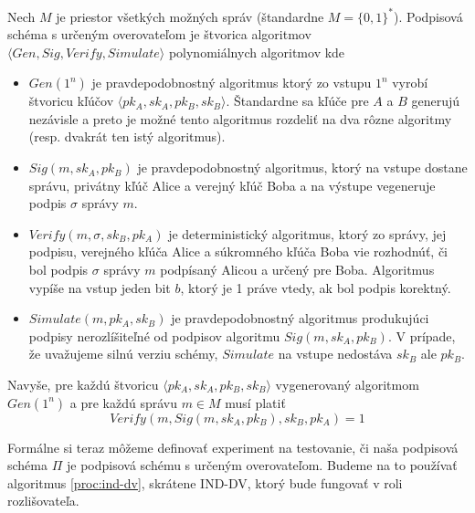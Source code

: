 \begin{definicia}
    Nech $M$ je priestor všetkých možných správ (štandardne
    $M=\{0,1\}^*$). Podpisová schéma s určeným overovateľom je
    štvorica algoritmov
    $\langle Gen, Sig, Verify, Simulate \rangle$ polynomiálnych
    algoritmov kde
    \begin{itemize}
        \item $Gen(1^n)$ je pravdepodobnostný algoritmus ktorý zo
            vstupu $1^n$ vyrobí štvoricu kľúčov
            $\langle pk_A,sk_A,pk_B,sk_B \rangle$.
            Štandardne sa kľúče pre $A$ a $B$ generujú nezávisle a
            preto je možné tento algoritmus rozdeliť na dva rôzne
            algoritmy (resp. dvakrát ten istý algoritmus).

        \item $Sig(m,sk_A,pk_B)$ je pravdepodobnostný algoritmus,
            ktorý na vstupe dostane správu, privátny kľúč Alice a
            verejný kľúč Boba a na výstupe vegeneruje podpis $\sigma$
            správy $m$.

        \item $Verify(m,\sigma,sk_B,pk_A)$ je deterministický
            algoritmus, ktorý zo správy, jej podpisu, verejného kľúča
            Alice a súkromného kľúča Boba vie rozhodnúť, či bol podpis
            $\sigma$ správy $m$ podpísaný Alicou a určený pre Boba.
            Algoritmus vypíše na vstup jeden bit $b$, ktorý je 1 práve
            vtedy, ak bol podpis korektný.

        \item $Simulate(m,pk_A,sk_B)$ je pravdepodobnostný algoritmus
            produkujúci podpisy nerozlíšiteľné od podpisov algoritmu
            $Sig(m,sk_A,pk_B)$.
            V prípade, že uvažujeme silnú verziu schémy, $Simulate$ na
            vstupe nedostáva $sk_B$ ale $pk_B$.
    \end{itemize}
    Navyše, pre každú štvoricu $\langle pk_A,sk_A,pk_B,sk_B \rangle$
    vygenerovaný algoritmom $Gen(1^n)$ a pre každú správu $m\in M$
    musí platiť
    \begin{equation*}
        Verify(m, Sig(m,sk_A,pk_B),sk_B,pk_A)=1
    \end{equation*}
\end{definicia}

Formálne si teraz môžeme definovať experiment na testovanie, či naša
podpisová schéma $\Pi$ je podpisová schému s určeným overovateľom.
Budeme na to používať algoritmus
\ref{proc:ind-dv}, skrátene IND-DV, ktorý bude fungovať v roli
rozlišovateľa.

